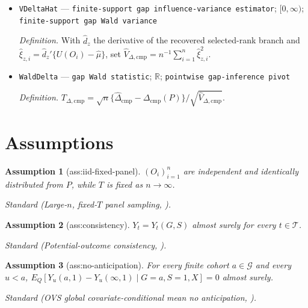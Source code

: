 \documentclass{article}
\newtheorem{assumption}{Assumption}
\begin{document}
\begin{itemize}
  \par\smallskip\noindent\emph{Definition.} \(\xi_z(O)=DF_z^\sharp\{\mu(P)\}'[U(O)-\mu(P)]\), where \(F_z^\sharp\) is the locally selected-rank branch.
  \item \texttt{VDeltaHat} --- \texttt{finite-\allowbreak{}support gap influence-\allowbreak{}variance estimator}; \([0,\infty)\); \texttt{finite-\allowbreak{}support gap Wald variance}
  \par\smallskip\noindent\emph{Definition.} With \(\widehat d_z\) the derivative of the recovered selected-rank branch and \(\widehat\xi_{z,i}=\widehat d_z'\{U(O_i)-\widehat\mu\}\), set \(\widehat V_{\Delta,\mathrm{cmp}}=n^{-1}\sum_{i=1}^n\widehat\xi_{z,i}^2\).
  \item \texttt{WaldDelta} --- \texttt{gap Wald statistic}; \(\mathbb R\); \texttt{pointwise gap-\allowbreak{}inference pivot}
  \par\smallskip\noindent\emph{Definition.} \(T_{\Delta,\mathrm{cmp}}=\sqrt n\{\widehat\Delta_{\mathrm{cmp}}-\Delta_{\mathrm{cmp}}(P)\}/\sqrt{\widehat V_{\Delta,\mathrm{cmp}}}\).
\end{itemize}

\section{Assumptions}

\begin{assumption}[ass:iid-fixed-panel]\label{ass:iid-fixed-panel}
\((O_i)_{i=1}^n\) are independent and identically distributed from \(P\), while \(T\) is fixed as \(n\to\infty\).
\par\smallskip\noindent\emph{Standard} (Large-\(n\), fixed-\(T\) panel sampling, \cite{OrtizVillavicencioSantAnna2025}).
\end{assumption}

\begin{assumption}[ass:consistency]\label{ass:consistency}
\(Y_t=Y_t(G,S)\) almost surely for every \(t\in\mathcal T\).
\par\smallskip\noindent\emph{Standard} (Potential-outcome consistency, \cite{OrtizVillavicencioSantAnna2025}).
\end{assumption}

\begin{assumption}[ass:no-anticipation]\label{ass:no-anticipation}
For every finite cohort \(a\in\mathcal G\) and every \(u<a\), \(E_Q[Y_u(a,1)-Y_u(\infty,1)\mid G=a,S=1,X]=0\) almost surely.
\par\smallskip\noindent\emph{Standard} (OVS global covariate-conditional mean no anticipation, \cite{OrtizVillavicencioSantAnna2025}).
\end{assumption}
\end{document}
